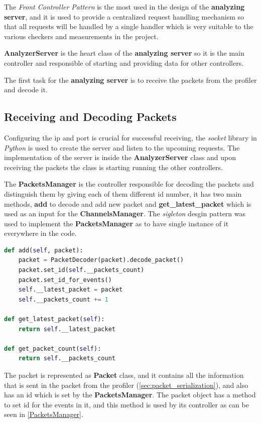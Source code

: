 The \textit{Front Controller Pattern} is the most used in the design of the \textbf{analyzing server},
and it is used to provide a centralized request handling 
mechanism so that all requests will be handled by a single handler which is very suitable to the various
checkers and measurements in the project.

\textbf{AnalyzerServer} is the heart class of the \textbf{analyzing server} so it is the main controller
and responsible of starting and providing data for other controllers.

The first task for the \textbf{analyzing server} is to receive the packets from the profiler and decode it.

\subsection{Receiving and Decoding Packets}
Configuring the ip and port is crucial for successful receiving, the \textit{socket} library in \textit{Python}
is used to create the server and listen to the upcoming requests. The implementation of the server is
inside the \textbf{AnalyzerServer} class and upon receiving the packets the class is starting running the
other controllers.

The \textbf{PacketsManager} is the controller responsible for decoding the packets and distinguish them
by giving each of them different id number, it has two main methods, \textbf{add} to decode and add new packet
and \textbf{get\_latest\_packet} which is used as an input for the \textbf{ChannelsManager}. The \textit{sigleton} 
desgin pattern was used to implement the \textbf{PacketsManager} as to have single instance of it 
everywhere in the code.
\newline
\begin{lstlisting}[language=Python, label=PacketsManager, caption={Puplic methods of PacketsManager},captionpos=b]
def add(self, packet):
	packet = PacketDecoder(packet).decode_packet()
	packet.set_id(self.__packets_count)
	packet.set_id_for_events()
	self.__latest_packet = packet
	self.__packets_count += 1

def get_latest_packet(self):
	return self.__latest_packet

def get_packet_count(self):
	return self.__packets_count

\end{lstlisting}

The packet is represented as \textbf{Packet} class, and it contains all the information that is sent
in the packet from the profiler (\ref{sec:packet_serialization}), and also has an id which is set by the
\textbf{PacketsManager}. The packet object has a method to set id for the events in it, and this method
is used by its controller as can be seen in \ref{PacketsManager}.


